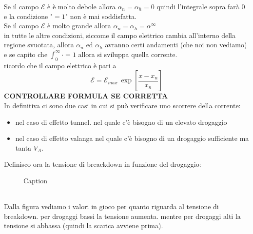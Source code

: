 Se il campo $\mathcal{E}$ è è molto debole allora $\alpha_n=\alpha_h=0$ quindi l'integrale sopra farà 0 e la condizione "$=1$" non è mai soddisfatta.\\
Se il campo $\mathcal{E}$ è molto grande allora $\alpha_n=\alpha_h=\alpha^{\infty}$ \\
in tutte le altre condizioni, siccome il campo elettrico cambia all'interno della regione svuotata,  allora $\alpha_n$ ed $\alpha_h$ avranno certi andamenti (che noi non vediamo) e se capito che $\int_{0}^{\infty}\cdot=1$ allora si sviluppa quella corrente.\\
ricordo che il campo elettrico è pari a 
\begin{equation}
    \mathcal{E}=\mathcal{E}_{max}\ \exp\left[\dfrac{x-x_n}{x_n}\right]
\end{equation}
\textbf{CONTROLLARE FORMULA SE CORRETTA}\\
\cleardoublepage%
In definitiva ci sono due casi in cui si può verificare uno scorrere della corrente:
\begin{itemize}
    \item nel caso di effetto tunnel. nel quale c'è bisogno di un elevato drogaggio
    \item nel caso di effetto valanga nel quale c'è bisogno di un drogaggio sufficiente ma tanta $V_A$.
\end{itemize}
%
Definisco ora la tensione di breackdown in funzione del drogaggio:\\
\begin{figure}[hbt!]
    \centering
    \caption{Caption}%
    \label{fig:enter_label}
\end{figure}
\\%
Dalla figura vediamo i valori in gioco per quanto riguarda al tensione di breakdown. per drogaggi bassi la tensione aumenta. mentre per drogaggi alti la tensione si abbassa (quindi la scarica avviene prima).

